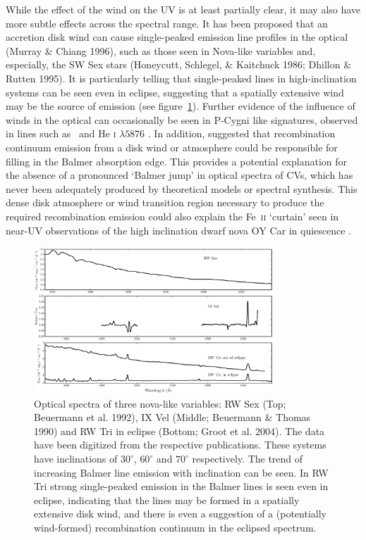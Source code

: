 \documentclass[preprint, a4paper, 11pt]{aastex}
\begin{document}
While the effect of the wind on the UV is at least partially clear, it may also have more subtle 
effects across the spectral range. It has been proposed that an accretion disk wind
can cause single-peaked emission line profiles in the optical (Murray \& Chiang 1996), 
such as those seen in Nova-like variables and, especially, the SW Sex stars (Honeycutt, Schlegel,
\& Kaitchuck 1986; Dhillon \& Rutten 1995). It is particularly telling that single-peaked 
lines in high-inclination systems can be seen even in eclipse, suggesting 
that a spatially extensive wind may be the source of emission (see figure~\ref{novalikes}).
Further evidence of the influence of winds in the optical can occasionally 
be seen in P-Cygni like signatures, observed in lines such as \ha\ 
and He \textsc{i} $\lambda5876$ \citep{RN98}.
In addition, \cite{KLWB98} suggested
that recombination continuum emission from a disk wind or atmosphere
could be responsible for filling in the Balmer absorption edge. This provides
a potential explanation for
the absence of a pronounced `Balmer jump' in optical spectra of CVs, which has never been adequately produced 
by theoretical models or spectral synthesis.
This dense disk atmosphere or wind transition region
necessary to produce the required recombination emission
could also explain the Fe~\textsc{ii} `curtain'
seen in near-UV observations of the high inclination dwarf nova OY Car in quiescence 
\citep{horne1994}.


\begin{figure}	%
\centering
\includegraphics[width=0.8\textwidth]{figures/fig1.eps}
\caption{Optical spectra of three nova-like variables: 
RW Sex (Top; Beuermann et al. 1992),
IX Vel (Middle; Beuermann \& Thomas 1990)
and RW Tri in eclipse (Bottom; Groot et al. 2004).
The data have been digitized from the respective publications. 
These systems have inclinations of $30^\circ$, $60^\circ$ and $70^\circ$ 
respectively.
The trend of increasing Balmer line emission with inclination can be seen.
In RW Tri strong single-peaked emission in the Balmer lines is seen even
in eclipse, indicating that the lines may be formed in a spatially extensive disk wind, and there is even a suggestion
of a (potentially wind-formed) recombination continuum in the eclipsed spectrum.}
\label{novalikes}
\end{figure}
\end{document}
